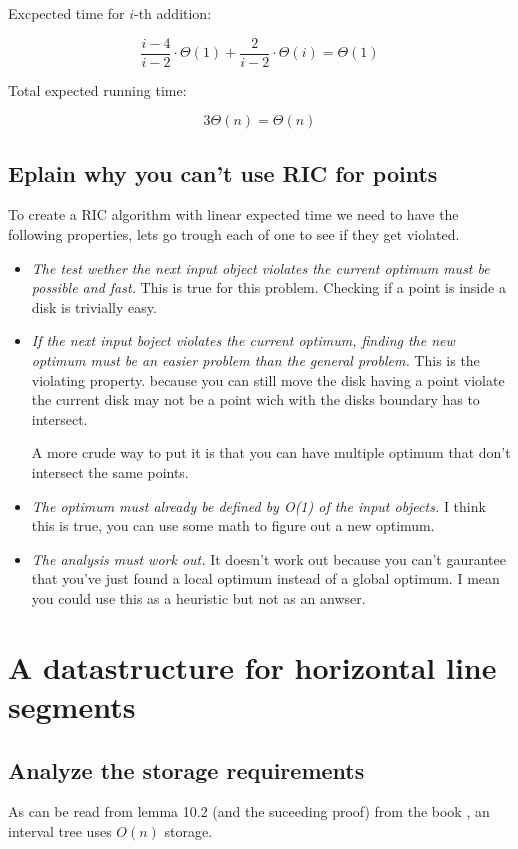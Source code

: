\documentclass{article}
\begin{document}
Excpected time for $i$-th addition:

\[\frac{i-4}{i-2}\cdot\Theta(1)+\frac{2}{i-2}\cdot\Theta(i)=\Theta(1)\]

Total expected running time:

\[3\Theta(n) = \Theta(n)\]

\subsection{Eplain why you can't use RIC for points}
To create a RIC algorithm with linear expected time we need to have the
following properties, lets go trough each of one to see if they get violated.

\begin{itemize}
	\item \emph{The test wether the next input object violates the current
		optimum must be possible and fast.}
		This is true for this problem. Checking if a point is inside a disk
		is trivially easy.
	\item \emph{If the next input boject violates the current optimum,
		finding the new optimum must be an easier problem than the general
		problem.}
		This is the violating property. because you can still move
		the disk having a point violate the current disk may not be a point
		wich with the disks boundary has to intersect.

		A more crude way to put it is that you can have multiple optimum
		that don't intersect the same points.
	\item \emph{The optimum must already be defined by O(1) of the input
		objects.}
		I think this is true, you can use some math to figure out a new
		optimum.
	\item \emph{The analysis must work out.}
		It doesn't work out because you can't gaurantee that you've just
		found a local optimum instead of a global optimum. I mean you
		could use this as a heuristic but not as an anwser.
\end{itemize}
\section{A datastructure for horizontal line segments}
\subsection{Analyze the storage requirements}
As can be read from lemma 10.2 (and the suceeding proof) from
the book \cite{book}, an interval tree uses $O(n)$ storage.
\end{document}
